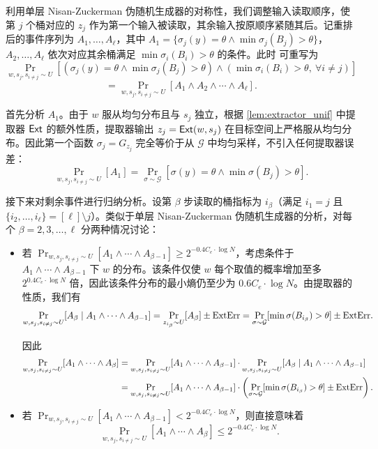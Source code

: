 利用单层 Nisan-Zuckerman 伪随机生成器的对称性，我们调整输入读取顺序，使第 $j$ 个桶对应的 $z_j$ 作为第一个输入被读取，其余输入按原顺序紧随其后。记重排后的事件序列为 $A_1, \ldots, A_\ell$，其中 $A_1 = \{ \sigma_j(y) = \theta \wedge \min \sigma_j(B_j) > \theta \}$，$A_2, \ldots, A_\ell$ 依次对应其余桶满足 $\min \sigma_i(B_i) > \theta$ 的条件。此时 可重写为
$$
\Pr_{w, s_j, s_{i \ne j} \sim U}\left[ (\sigma_j(y) = \theta \wedge \min \sigma_j(B_j) > \theta) \wedge (\min \sigma_i(B_i) > \theta,\ \forall i \ne j) \right]
$$
\begin{equation}
    = \Pr_{w, s_j, s_{i \ne j} \sim U}\left[ A_1 \wedge A_2 \wedge \cdots \wedge A_\ell \right]. \label{eq:robp_joint}
\end{equation}

首先分析 $A_1$。由于 $w$ 服从均匀分布且与 $s_j$ 独立，根据 \cref{lem:extractor_unif} 中提取器 $\mathsf{Ext}$ 的额外性质，提取器输出 $z_j = \mathsf{Ext}(w, s_j)$ 在目标空间上严格服从均匀分布。因此第一个函数 $\sigma_j = G_{z_j}$ 完全等价于从 $\mathcal{G}$ 中均匀采样，不引入任何提取器误差：
$$
\Pr_{w, s_j, s_{i \ne j} \sim U}[A_1] = \Pr_{\sigma \sim \mathcal{G}}[\sigma(y) = \theta \wedge \min \sigma(B_j) > \theta].
$$

接下来对剩余事件进行归纳分析。设第 $\beta$ 步读取的桶指标为 $i_\beta$（满足 $i_1 = j$ 且 $\{i_2, \ldots, i_\ell\} = [\ell] \setminus j$）。类似于单层 Nisan-Zuckerman 伪随机生成器的分析，对每个 $\beta = 2, 3, \ldots, \ell$ 分两种情况讨论：
\begin{itemize}
    \item 若 $\Pr_{w, s_j, s_{i \ne j} \sim U}[A_1 \wedge \cdots \wedge A_{\beta - 1}] \ge 2^{-0.4 C_e \cdot \log N}$，考虑条件于 $A_1 \wedge \cdots \wedge A_{\beta - 1}$ 下 $w$ 的分布。该条件仅使 $w$ 每个取值的概率增加至多 $2^{0.4 C_e \cdot \log N}$ 倍，因此该条件分布的最小熵仍至少为 $0.6 C_e \cdot \log N$。由提取器的性质，我们有
    $$
    \Pr_{w, s_j, s_{i \ne j} \sim U}[A_\beta \mid A_1 \wedge \cdots \wedge A_{\beta - 1}] = \Pr_{z_{i_\beta} \sim U}[A_\beta] \pm \mathrm{ExtErr} = \Pr_{\sigma \sim \mathcal{G}}[\min \sigma(B_{i_\beta}) > \theta] \pm \mathrm{ExtErr}.
    $$

    因此
    \begin{align*}
        \Pr_{w, s_j, s_{i \ne j} \sim U}[A_1 \wedge \cdots \wedge A_\beta] & = \Pr_{w, s_j, s_{i \ne j} \sim U}[A_1 \wedge \cdots \wedge A_{\beta - 1}] \cdot \Pr_{w, s_j, s_{i \ne j} \sim U}[A_\beta \mid A_1 \wedge \cdots \wedge A_{\beta - 1}] \\
         & = \Pr_{w, s_j, s_{i \ne j} \sim U}[A_1 \wedge \cdots \wedge A_{\beta - 1}] \cdot \left( \Pr_{\sigma \sim \mathcal{G}}[\min \sigma(B_{i_\beta}) > \theta] \pm \mathrm{ExtErr} \right).
    \end{align*}

    \item 若 $\Pr_{w, s_j, s_{i \ne j} \sim U}[A_1 \wedge \cdots \wedge A_{\beta - 1}] < 2^{-0.4 C_e \cdot \log N}$，则直接意味着
    $$
    \Pr_{w, s_j, s_{i \ne j} \sim U}[A_1 \wedge \cdots \wedge A_\beta] \le 2^{-0.4 C_e \cdot \log N}.
    $$
\end{itemize}

